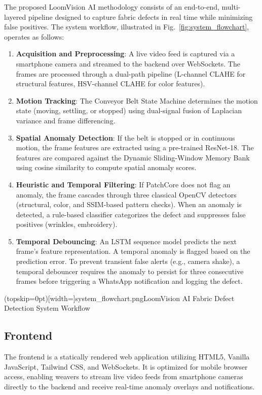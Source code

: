 \documentclass{ieeeaccess}
\begin{document}
The proposed LoomVision AI methodology consists of an end-to-end, multi-layered pipeline designed to capture fabric defects in real time while minimizing false positives. The system workflow, illustrated in Fig.~\ref{fig:system_flowchart}, operates as follows:
\begin{enumerate}
    \item \textbf{Acquisition and Preprocessing}: A live video feed is captured via a smartphone camera and streamed to the backend over WebSockets. The frames are processed through a dual-path pipeline (L-channel CLAHE for structural features, HSV-channel CLAHE for color features).
    \item \textbf{Motion Tracking}: The Conveyor Belt State Machine determines the motion state (moving, settling, or stopped) using dual-signal fusion of Laplacian variance and frame differencing.
    \item \textbf{Spatial Anomaly Detection}: If the belt is stopped or in continuous motion, the frame features are extracted using a pre-trained ResNet-18. The features are compared against the Dynamic Sliding-Window Memory Bank using cosine similarity to compute spatial anomaly scores.
    \item \textbf{Heuristic and Temporal Filtering}: If PatchCore does not flag an anomaly, the frame cascades through three classical OpenCV detectors (structural, color, and SSIM-based pattern checks). When an anomaly is detected, a rule-based classifier categorizes the defect and suppresses false positives (wrinkles, embroidery).
    \item \textbf{Temporal Debouncing}: An LSTM sequence model predicts the next frame's feature representation. A temporal anomaly is flagged based on the prediction error. To prevent transient false alerts (e.g., camera shake), a temporal debouncer requires the anomaly to persist for three consecutive frames before triggering a WhatsApp notification and logging the defect.
\end{enumerate}

\Figure[htbp](topskip=0pt)[width=\textwidth]{system_flowchart.png}{LoomVision AI Fabric Defect Detection System Workflow\label{fig:system_flowchart}}

\subsection{Frontend}
The frontend is a statically rendered web application utilizing HTML5, Vanilla JavaScript, Tailwind CSS, and WebSockets. It is optimized for mobile browser access, enabling weavers to stream live video feeds from smartphone cameras directly to the backend and receive real-time anomaly overlays and notifications.
\end{document}
